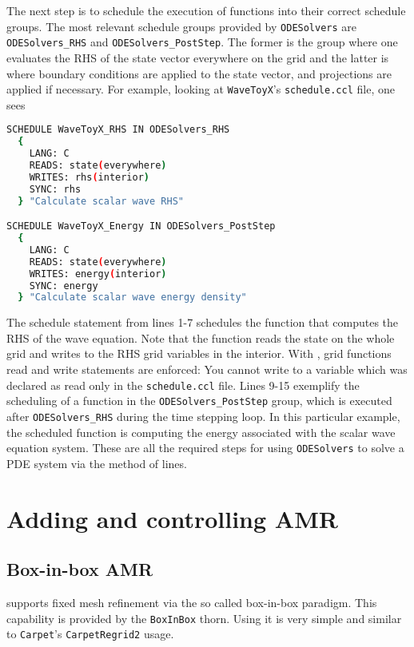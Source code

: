 The next step is to schedule the execution of functions into their correct schedule groups. The most relevant schedule groups provided by \texttt{ODESolvers} are \texttt{ODESolvers\_RHS} and \texttt{ODESolvers\_PostStep}. The former is the group where one evaluates the RHS of the state vector everywhere on the grid and the latter is where boundary conditions are applied to the state vector, and projections are applied if necessary. For example, looking at \texttt{WaveToyX}'s \texttt{schedule.ccl} file, one sees

\begin{lstlisting}[language=bash]
  SCHEDULE WaveToyX_RHS IN ODESolvers_RHS
  {
    LANG: C
    READS: state(everywhere)
    WRITES: rhs(interior)
    SYNC: rhs
  } "Calculate scalar wave RHS"

SCHEDULE WaveToyX_Energy IN ODESolvers_PostStep
  {
    LANG: C
    READS: state(everywhere)
    WRITES: energy(interior)
    SYNC: energy
  } "Calculate scalar wave energy density"
\end{lstlisting}

The schedule statement from lines 1-7 schedules the function that computes the RHS of the wave equation. Note that the function reads the state on the whole grid and writes to the RHS grid variables in the interior. With \CarpetX, grid functions read and write statements are enforced: You cannot write to a variable which was declared as read only in the \texttt{schedule.ccl} file. Lines 9-15 exemplify the scheduling of a function in the \texttt{ODESolvers\_PostStep} group, which is executed after \texttt{ODESolvers\_RHS} during the time stepping loop. In this particular example, the scheduled function is computing the energy associated with the scalar wave equation system. These are all the required steps for using \texttt{ODESolvers} to solve a PDE system via the method of lines.

\section{Adding and controlling AMR}
\label{sec:amr}


\subsection{Box-in-box AMR}
\label{sec:box_in_box_amr}
\CarpetX\space supports fixed mesh refinement via the so called box-in-box paradigm. This capability is provided by the \texttt{BoxInBox} thorn. Using it is very simple and similar to \texttt{Carpet}'s \texttt{CarpetRegrid2} usage.

